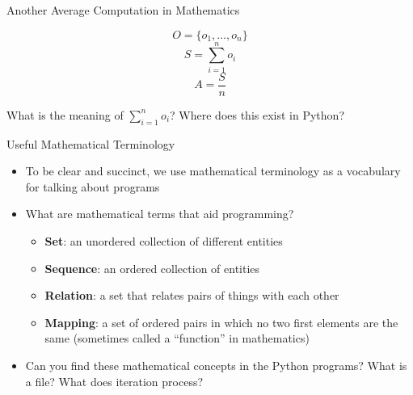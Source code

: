 \documentclass[14pt,aspectratio=169]{beamer}
\begin{document}
%
\begin{frame}{Another Average Computation in Mathematics}
  \vspace*{-.5in}
  \begin{center}
  \fontsize{20}{30}\selectfont
    \begin{equation*}
     O = \{o_1, \ldots, o_n\}
    \end{equation*}
    \begin{equation*}
      S = \sum_{i=1}^{n} o_i
    \end{equation*}
    \begin{equation*}
      A = \frac{S}{n}
    \end{equation*}
  \end{center}
  \vspace{2ex}
  \begin{center}
    \small What is the meaning of $\sum_{i=1}^{n} o_i$? Where does this exist in Python?
  \end{center}
\end{frame}


%
\begin{frame}{Useful Mathematical Terminology}
  \begin{itemize}
    \item To be clear and succinct, we use mathematical terminology as a
      vocabulary for talking about programs
      \vspace*{-.15in}
    \item What are mathematical terms that aid programming?
      \begin{itemize}
        \item {\bf Set}: an unordered collection of different entities
        \item {\bf Sequence}: an ordered collection of entities
        \item {\bf Relation}: a set that relates pairs of things with each other
        \item {\bf Mapping}: a set of ordered pairs in which no two first
          elements are the same (sometimes called a ``function'' in mathematics)
      \end{itemize}
      \vspace*{-.2in}
    \item Can you find these mathematical concepts in the Python programs?
      What is a file? What does iteration process?
  \end{itemize}
\end{frame}
\end{document}
